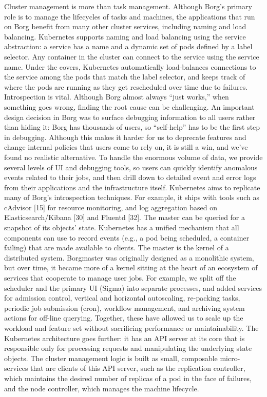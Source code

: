 Cluster management is more than task management.
Although Borg’s primary role is to manage the lifecycles
of tasks and machines, the applications that run on Borg
benefit from many other cluster services, including naming
and load balancing. Kubernetes supports naming and load
balancing using the service abstraction: a service has a name
and a dynamic set of pods defined by a label selector. Any
container in the cluster can connect to the service using the
service name. Under the covers, Kubernetes automatically
load-balances connections to the service among the pods that
match the label selector, and keeps track of where the pods
are running as they get rescheduled over time due to failures.
Introspection is vital. Although Borg almost always
“just works,” when something goes wrong, finding the root
cause can be challenging. An important design decision in
Borg was to surface debugging information to all users rather
than hiding it: Borg has thousands of users, so “self-help”
has to be the first step in debugging. Although this makes it
harder for us to deprecate features and change internal policies that users come to rely on, it is still a win, and we’ve
found no realistic alternative. To handle the enormous volume of data, we provide several levels of UI and debugging
tools, so users can quickly identify anomalous events related
to their jobs, and then drill down to detailed event and error
logs from their applications and the infrastructure itself.
Kubernetes aims to replicate many of Borg’s introspection techniques. For example, it ships with tools such as
cAdvisor [15] for resource monitoring, and log aggregation
based on Elasticsearch/Kibana [30] and Fluentd [32]. The
master can be queried for a snapshot of its objects’ state.
Kubernetes has a unified mechanism that all components can
use to record events (e.g., a pod being scheduled, a container
failing) that are made available to clients.
The master is the kernel of a distributed system.
Borgmaster was originally designed as a monolithic system, but over time, it became more of a kernel sitting at the
heart of an ecosystem of services that cooperate to manage user jobs. For example, we split off the scheduler and
the primary UI (Sigma) into separate processes, and added
services for admission control, vertical and horizontal autoscaling, re-packing tasks, periodic job submission (cron),
workflow management, and archiving system actions for
off-line querying. Together, these have allowed us to scale
up the workload and feature set without sacrificing performance or maintainability.
The Kubernetes architecture goes further: it has an API
server at its core that is responsible only for processing requests and manipulating the underlying state objects. The
cluster management logic is built as small, composable
micro-services that are clients of this API server, such as
the replication controller, which maintains the desired number of replicas of a pod in the face of failures, and the node
controller, which manages the machine lifecycle.

